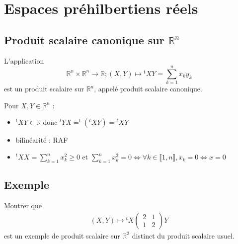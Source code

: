 \documentclass[../main.tex]{subfiles}
\begin{document}
\setcounter{chapter}{33}
\chapter{Espaces préhilbertiens réels}
\tableofcontents
\clearpage

\section{Produit scalaire canonique sur $\mathbb{R}^n$}
\begin{tcolorbox}[title=Théorème 34.4, title filled=false, colframe=orange, colback=orange!10!white]
    L'application
    $$\mathbb{R}^n \times \mathbb{R}^n \rightarrow \mathbb{R} ;(X, Y) \mapsto{ }^{\mathrm{t}} X Y=\sum_{k=1}^n x_k y_k$$
    est un produit scalaire sur $\mathbb{R}^n$, appelé produit scalaire canonique.
\end{tcolorbox}

\noindent Pour $X, Y \in \mathbb{R}^n$ :
\begin{itemize}
    \item $^tXY\in \mathbb{R}$ donc ${^tY}X = ^t({^tX}Y) = {^tX}Y$
    \item bilinéarité : RAF
    \item $^tXX = \sum\limits_{k=1}^{n} x_k^2 \geq 0$ et $\sum\limits_{k=1}^{n} x_k^2 = 0 \Leftrightarrow \forall k\in \llbracket 1, n \rrbracket, x_k = 0 \Leftrightarrow x = 0$
\end{itemize}

\section{Exemple}
\begin{tcolorbox}[title=Exemple , title filled=false, colframe=darkgreen, colback=darkgreen!10!white]
    Montrer que 
    \begin{align*}
        (X, Y) \mapsto {^tX} \begin{pmatrix}
            2 & 1 \\
            1 & 2
        \end{pmatrix} Y
    \end{align*}
    est un exemple de produit scalaire sur $\mathbb{R}^2$ distinct du produit scalaire usuel. 
\end{tcolorbox}
\end{document}
